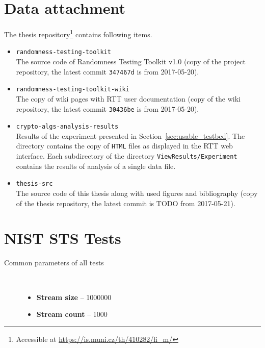 \documentclass[
	digital,    %
	oneside,    %
	color,
	11pt,
	nocover,
	notable,
	nolof,
	nolot,
]{fithesis3}
\newenvironment{titlemize}[1]
{
	\begin{description}
	\item[#1]\
	\begin{itemize}
}
{
	\end{itemize}
 	\end{description}
}
\theoremstyle{definition}
\theoremstyle{remark}
\begin{document}
\chapter{Data attachment}
\label{app:data_att}
The thesis repository\footnote{Accessible at \url{https://is.muni.cz/th/410282/fi_m/}}  contains following items.
\begin{itemize}
\item \texttt{randomness-testing-toolkit} \\
The source code of Randomness Testing Toolkit v1.0 (copy of the project repository, the latest commit \texttt{347467d} is from 2017-05-20).
\item \texttt{randomness-testing-toolkit-wiki} \\
The copy of wiki pages with RTT user documentation (copy of the wiki repository, the latest commit \texttt{30436be} is from 2017-05-20).
\item \texttt{crypto-algs-analysis-results} \\
Results of the experiment presented in Section~\ref{sec:usable_testbed}. The directory contains the copy of \texttt{HTML} files as displayed in the RTT web interface. Each subdirectory of the directory \texttt{ViewResults/Experiment} contains the results of analysis of a single data file. 
\item \texttt{thesis-src} \\
The source code of this thesis along with used figures and bibliography (copy of the thesis repository, the latest commit is TODO from 2017-05-21).
\end{itemize}

\chapter{NIST STS Tests}
\label{app:nist_sts_tests}

\begin{titlemize}{Common parameters of all tests}
\item \textbf{Stream size} -- 1000000
\item \textbf{Stream count} -- 1000
\end{titlemize}
\end{document}
